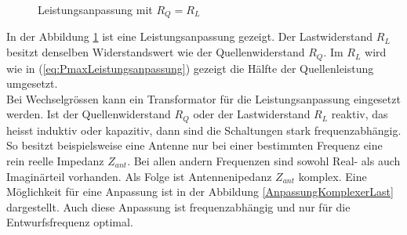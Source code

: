 \begin{figure}[!ht]
	\begin{center}
	\end{center}
\caption{Leistungsanpassung mit $R_Q = R_L$}
\label{fig:LeistungsanpassungU0_RQ_RL}
\end{figure}
In der Abbildung \ref{fig:LeistungsanpassungU0_RQ_RL} ist eine Leistungsanpassung gezeigt. 
Der Lastwiderstand $R_{L}$ besitzt denselben Widerstandswert wie der Quellenwiderstand $R_{Q}$. Im $R_{L}$ wird wie in  (\ref{eq:PmaxLeistungsanpassung}) gezeigt die Hälfte der Quellenleistung umgesetzt.\\
Bei Wechselgrössen kann ein Transformator für die Leistungsanpassung eingesetzt werden. Ist der Quellenwiderstand $R_Q$ oder der Lastwiderstand $R_L$  reaktiv, das heisst induktiv oder kapazitiv, dann sind die Schaltungen stark frequenzabhängig. So besitzt beispielsweise eine Antenne nur bei einer bestimmten Frequenz eine rein reelle Impedanz $Z_{ant}$. Bei allen andern Frequenzen sind sowohl Real- als auch Imaginärteil vorhanden. Als Folge ist Antennenipedanz $Z_{ant}$  komplex. Eine Möglichkeit für eine Anpassung ist in der Abbildung \ref{AnpassungKomplexerLast} dargestellt. Auch diese  Anpassung ist frequenzabhängig und nur für die Entwurfsfrequenz optimal.
